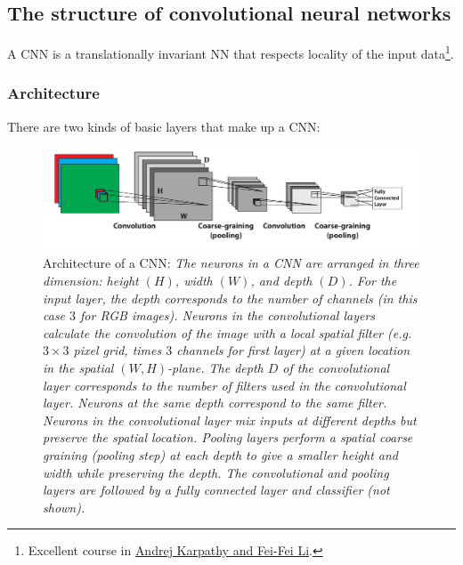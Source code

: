 \subsection{The structure of convolutional neural networks}
\label{subsec:cnnStructure}
A CNN is a translationally invariant NN that respects locality of the input data\footnote{Excellent course in \href{https://cs231n.github.io/}{Andrej Karpathy and Fei-Fei Li}.}.
\subsubsection{Architecture}
There are two kinds of basic layers that make up a CNN:

\begin{figure}[h!]
	\centering
	\includegraphics[width=0.8\linewidth]{gfx/cnn}
	\caption{Architecture of a CNN: \itshape The neurons in a CNN are arranged in three dimension: height $(H)$, width $(W)$, and depth $(D)$. For the input layer, the depth corresponds to the  number of channels (in this case $3$ for RGB images). Neurons in the convolutional layers calculate the convolution of the image with a local spatial filter (e.g. $3\times 3$ pixel grid, times $3$ channels for first layer) at a given location in the spatial $(W,H)$-plane. The depth $D$ of the convolutional layer corresponds to the number of filters used in the convolutional layer. Neurons at the same depth correspond to the same filter. Neurons in the convolutional layer mix inputs at different depths but preserve the spatial location. Pooling layers perform a spatial coarse graining (pooling step) at each depth to give a smaller height and width while preserving the depth. The convolutional and pooling layers are followed by a fully connected layer and classifier (not shown).}
	\label{fig:cnn}
\end{figure}

